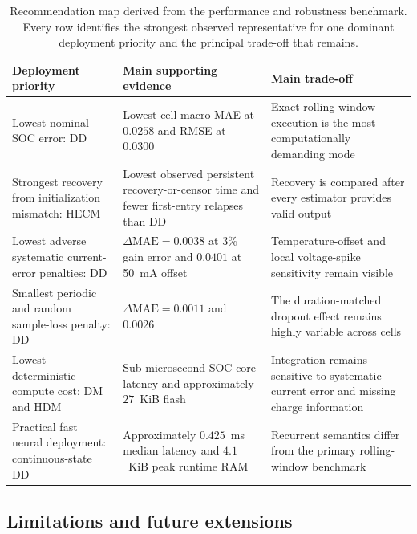 \begin{table}[H]
    \centering
    \footnotesize
    \renewcommand{\arraystretch}{1.12}
    \setlength{\tabcolsep}{3pt}
    \caption[Deployment-oriented estimator recommendation map.]{Recommendation map derived from the performance and robustness benchmark. Every row identifies the strongest observed representative for one dominant deployment priority and the principal trade-off that remains.}
    \label{tab:robustness_decision_guidance}
    \begin{tabularx}{\textwidth}{@{}>{\raggedright\arraybackslash}p{3.7cm}>{\raggedright\arraybackslash}X>{\raggedright\arraybackslash}X@{}}
        \toprule
        Deployment priority & Main supporting evidence & Main trade-off \\
        \midrule
        Lowest nominal SOC error: DD & Lowest cell-macro MAE at $0.0258$ and RMSE at $0.0300$ & Exact rolling-window execution is the most computationally demanding mode \\
        Strongest recovery from initialization mismatch: HECM & Lowest observed persistent recovery-or-censor time and fewer first-entry relapses than DD & Recovery is compared after every estimator provides valid output \\
        Lowest adverse systematic current-error penalties: DD & $\Delta\mathrm{MAE}=0.0038$ at $3\%$ gain error and $0.0401$ at \SI{50}{\milli\ampere} offset & Temperature-offset and local voltage-spike sensitivity remain visible \\
        Smallest periodic and random sample-loss penalty: DD & $\Delta\mathrm{MAE}=0.0011$ and $0.0026$ & The duration-matched dropout effect remains highly variable across cells \\
        Lowest deterministic compute cost: DM and HDM & Sub-microsecond SOC-core latency and approximately $27$~KiB flash & Integration remains sensitive to systematic current error and missing charge information \\
        Practical fast neural deployment: continuous-state DD & Approximately $0.425$~ms median latency and $4.1$~KiB peak runtime RAM & Recurrent semantics differ from the primary rolling-window benchmark \\
        \bottomrule
    \end{tabularx}
\end{table}

\subsection{Limitations and future extensions}

